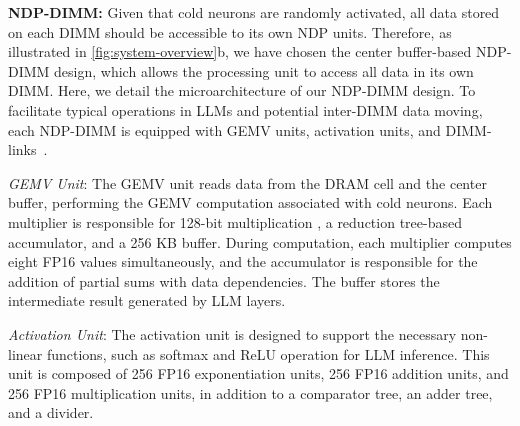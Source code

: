 \textbf{NDP-DIMM:}
Given that cold neurons are randomly activated, all data stored on each DIMM should be accessible to its own NDP units.  Therefore, as illustrated in \fig \ref{fig:system-overview}b, we have chosen the center buffer-based NDP-DIMM design\cite{alian2018application,cong2017aim,ke2020recnmp,kwon2019tensordimm}, which allows the processing unit to access all data in its own DIMM. 
Here, we detail the microarchitecture of our NDP-DIMM design. To facilitate typical operations in LLMs and potential inter-DIMM data moving, each NDP-DIMM is equipped with GEMV units, activation units, and DIMM-links~\cite{zhou2023dimm}.

\textit{GEMV Unit}: 
The GEMV unit reads data from the DRAM cell and the center buffer, performing the GEMV computation associated with cold neurons. 
Each multiplier is responsible for 128-bit multiplication , a reduction tree-based accumulator, and a 256 KB buffer. During computation, each multiplier computes eight FP16 values simultaneously, and the accumulator is responsible for the addition of partial sums with data dependencies. The buffer stores the intermediate result generated by LLM layers. 


\textit{Activation Unit}: The activation unit is designed to support the necessary non-linear functions, such as softmax and ReLU operation for LLM inference. 
This unit is composed of 256 FP16 exponentiation units, 256 FP16 addition units, and 256 FP16 multiplication units, in addition to a comparator tree, an adder tree, and a divider. 


